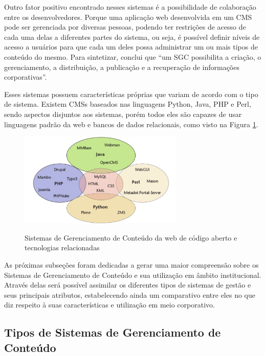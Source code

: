 Outro fator positivo encontrado nesses sistemas é a possibilidade de colaboração entre os desenvolvedores. Porque uma aplicação web desenvolvida em um CMS pode ser gerenciada por diversas pessoas, podendo ter restrições de acesso de cada uma delas a diferentes partes do sistema, ou seja, é possível definir níveis de acesso a usuários para que cada um deles possa administrar um ou mais tipos de conteúdo do mesmo. Para sintetizar,  conclui que ``um SGC possibilita a criação, o gerenciamento, a distribuição, a publicação e a recuperação de informações corporativas''.

Esses sistemas possuem características próprias que variam de acordo com o tipo de sistema. Existem CMSs baseados nas linguagens Python, Java, PHP e Perl, sendo aspectos disjuntos aos sistemas, porém todos eles são capazes de usar linguagens padrão da web e bancos de dados relacionais, como visto na Figura \ref{figura3}.

\begin{figure}[htb]
 \centering
 \caption{Sistemas de Gerenciamento de Conteúdo da web de código aberto e tecnologias relacionadas}
 \includegraphics[width=0.7\textwidth]{figuras/linguagens-cms-1}
 \label{figura3}
\end{figure}

\newpage
As próximas subseções foram dedicadas a gerar uma maior compreensão sobre os Sistemas de Gerenciamento de Conteúdo e sua utilização em âmbito institucional. Através delas será possível assimilar os diferentes tipos de sistemas de gestão e seus principais atributos, estabelecendo ainda um comparativo entre eles no que diz respeito à suas características e utilização em meio corporativo.

\hspace{2.5cm}

\subsection{Tipos de Sistemas de Gerenciamento de Conteúdo}
\label{subsec:tipos-cms}
\hspace{2.5cm}

